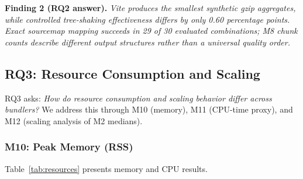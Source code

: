 \documentclass[preprint,12pt]{elsarticle}
\begin{document}
\medskip\noindent\textbf{Finding 2 (RQ2 answer).} \textit{Vite produces the smallest synthetic gzip aggregates, while controlled tree-shaking effectiveness differs by only 0.60 percentage points. Exact sourcemap mapping succeeds in 29 of 30 evaluated combinations; M8 chunk counts describe different output structures rather than a universal quality order.}


\subsection{RQ3: Resource Consumption and Scaling}\label{sec:rq3}

RQ3 asks: \emph{How do resource consumption and scaling behavior differ across bundlers?}
We address this through M10 (memory), M11 (CPU-time proxy), and M12 (scaling analysis of M2 medians).

\subsubsection{M10: Peak Memory (RSS)}

Table~\ref{tab:resources} presents memory and CPU results.
\end{document}
